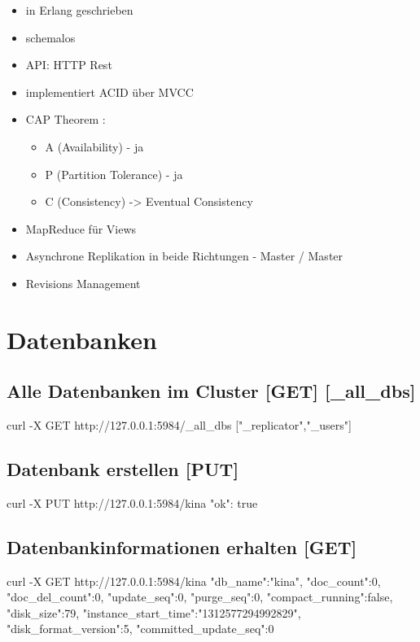 \documentclass[19pt,landscape,twocolumn]{article}
\newcommand{\htmlverb}[1]{{[}\textbf{{#1}}{]}}
\begin{document}
\begin{itemize}
  \setlength{\parskip}{0pt}
  \item in Erlang \cite{4} geschrieben
  \item schemalos
  \item API: HTTP Rest \cite{5}
  \item implementiert ACID \cite{6} über MVCC \cite{7}
  \item CAP Theorem \cite{8}:
    \begin{itemize} 
      \item A (Availability) - ja
      \item P (Partition Tolerance) - ja
      \item C (Consistency) -> Eventual Consistency
    \end{itemize}
  \item MapReduce \cite{9} für Views
  \item Asynchrone Replikation in beide Richtungen - Master / Master
  \item Revisions Management
\end{itemize}

\section{Datenbanken}
\subsection{Alle Datenbanken im Cluster \htmlverb{GET} \htmlverb{\_all\_dbs}}

\begin{code}
curl -X GET http://127.0.0.1:5984/_all_dbs
["_replicator","_users"]
\end{code}

\subsection{Datenbank erstellen \htmlverb{PUT}}

\begin{code}
curl -X PUT http://127.0.0.1:5984/kina
{"ok": true}
\end{code}

\subsection{Datenbankinformationen erhalten \htmlverb{GET}}

\begin{code}
curl -X GET http://127.0.0.1:5984/kina
{"db_name":"kina",
 "doc_count":0,
 "doc_del_count":0,
 "update_seq":0,
 "purge_seq":0,
 "compact_running":false,
 "disk_size":79,
 "instance_start_time":"1312577294992829",
 "disk_format_version":5,
 "committed_update_seq":0}
\end{code}
\end{document}
